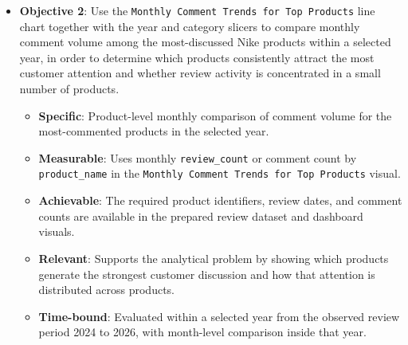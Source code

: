     \begin{itemize}
        \item \textbf{Objective 2}: Use the \texttt{Monthly Comment Trends for Top Products} line chart together with the year and category slicers to compare monthly comment volume among the most-discussed Nike products within a selected year, in order to determine which products consistently attract the most customer attention and whether review activity is concentrated in a small number of products.
        \begin{itemize}
            \item \textbf{Specific}: Product-level monthly comparison of comment volume for the most-commented products in the selected year.
            \item \textbf{Measurable}: Uses monthly \texttt{review\_count} or comment count by \texttt{product\_name} in the \texttt{Monthly Comment Trends for Top Products} visual.
            \item \textbf{Achievable}: The required product identifiers, review dates, and comment counts are available in the prepared review dataset and dashboard visuals.
            \item \textbf{Relevant}: Supports the analytical problem by showing which products generate the strongest customer discussion and how that attention is distributed across products.
            \item \textbf{Time-bound}: Evaluated within a selected year from the observed review period 2024 to 2026, with month-level comparison inside that year.
        \end{itemize}
    \end{itemize}

